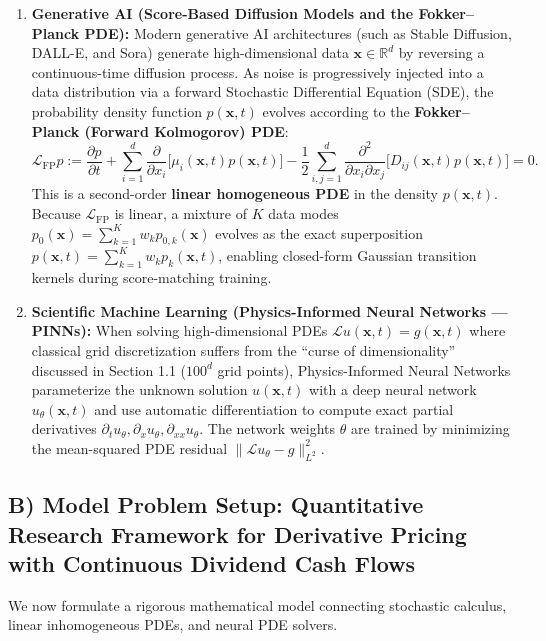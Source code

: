 \documentclass[11pt,a4paper]{article}
\begin{document}
\begin{enumerate}
    \item \textbf{Generative AI (Score-Based Diffusion Models and the Fokker--Planck PDE):}
    Modern generative AI architectures (such as Stable Diffusion, DALL-E, and Sora) generate high-dimensional data $\mathbf{x} \in \mathbb{R}^d$ by reversing a continuous-time diffusion process. As noise is progressively injected into a data distribution via a forward Stochastic Differential Equation (SDE), the probability density function $p(\mathbf{x}, t)$ evolves according to the \textbf{Fokker--Planck (Forward Kolmogorov) PDE}:
    \[
        \mathcal{L}_{\text{FP}} p := \frac{\partial p}{\partial t} + \sum_{i=1}^d \frac{\partial}{\partial x_i}\big[\mu_i(\mathbf{x}, t) p(\mathbf{x}, t)\big] - \frac{1}{2}\sum_{i,j=1}^d \frac{\partial^2}{\partial x_i \partial x_j}\big[D_{ij}(\mathbf{x}, t) p(\mathbf{x}, t)\big] = 0.
    \]
    This is a second-order \textbf{linear homogeneous PDE} in the density $p(\mathbf{x}, t)$. Because $\mathcal{L}_{\text{FP}}$ is linear, a mixture of $K$ data modes $p_0(\mathbf{x}) = \sum_{k=1}^K w_k p_{0,k}(\mathbf{x})$ evolves as the exact superposition $p(\mathbf{x}, t) = \sum_{k=1}^K w_k p_k(\mathbf{x}, t)$, enabling closed-form Gaussian transition kernels during score-matching training.

    \item \textbf{Scientific Machine Learning (Physics-Informed Neural Networks --- PINNs):}
    When solving high-dimensional PDEs $\mathcal{L}u(\mathbf{x}, t) = g(\mathbf{x}, t)$ where classical grid discretization suffers from the ``curse of dimensionality'' discussed in Section 1.1 ($100^d$ grid points), Physics-Informed Neural Networks parameterize the unknown solution $u(\mathbf{x}, t)$ with a deep neural network $u_\theta(\mathbf{x}, t)$ and use automatic differentiation to compute exact partial derivatives $\partial_t u_\theta, \partial_x u_\theta, \partial_{xx} u_\theta$. The network weights $\theta$ are trained by minimizing the mean-squared PDE residual $\|\mathcal{L}u_\theta - g\|_{L^2}^2$.
\end{enumerate}

\subsection{B) Model Problem Setup: Quantitative Research Framework for Derivative Pricing with Continuous Dividend Cash Flows}
We now formulate a rigorous mathematical model connecting stochastic calculus, linear inhomogeneous PDEs, and neural PDE solvers.
\end{document}
